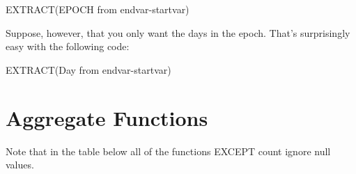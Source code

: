 \documentclass[
  letterpaper,
  DIV=11,
  numbers=noendperiod]{scrreprt}
\newenvironment{Shaded}{\begin{snugshade}}{\end{snugshade}}
\newcommand{\DataTypeTok}[1]{\textcolor[rgb]{0.68,0.00,0.00}{#1}}
\newcommand{\FunctionTok}[1]{\textcolor[rgb]{0.28,0.35,0.67}{#1}}
\newcommand{\KeywordTok}[1]{\textcolor[rgb]{0.00,0.23,0.31}{#1}}
\newcommand{\NormalTok}[1]{\textcolor[rgb]{0.00,0.23,0.31}{#1}}
\newcommand{\OperatorTok}[1]{\textcolor[rgb]{0.37,0.37,0.37}{#1}}
\begin{document}
\begin{Shaded}
\begin{Highlighting}[]
\FunctionTok{EXTRACT}\NormalTok{(EPOCH }\KeywordTok{from}\NormalTok{ endvar}\OperatorTok{{-}}\NormalTok{startvar)}
\end{Highlighting}
\end{Shaded}

Suppose, however, that you only want the days in the epoch. That's
surprisingly easy with the following code:

\begin{Shaded}
\begin{Highlighting}[]
\FunctionTok{EXTRACT}\NormalTok{(}\DataTypeTok{Day} \KeywordTok{from}\NormalTok{ endvar}\OperatorTok{{-}}\NormalTok{startvar)}
\end{Highlighting}
\end{Shaded}

\hypertarget{sec-aggregate}{%
\section{Aggregate Functions}\label{sec-aggregate}}

Note that in the table below all of the functions EXCEPT count ignore
null values.
\end{document}
